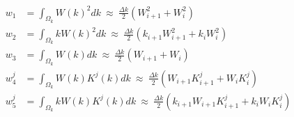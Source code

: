 \documentclass{article}
\def\ds{\displaystyle}
\begin{document}
\begin{align*}
w_1 & = \ds\int_{\Omega_k} W(k)^2 dk \: \approx \: \frac{\Delta k}{2}\left(W_{i+1}^2 + W_i^2 \right)  \\[5pt]
w_2 & = \ds\int_{\Omega_k} kW(k)^2 dk \: \approx \: \frac{\Delta k}{2}\left( k_{i+1}W_{i+1}^2+k_iW_i^2\right)   \\[5pt]
w_3 & = \ds\int_{\Omega_k} W(k)dk \: \approx \: \frac{\Delta k}{2} \left( W_{i+1} + W_i \right) \\[5pt]
w^j_4 & = \ds\int_{\Omega_k}W(k)K^j(k) dk \: \approx \: \frac{\Delta k}{2} \left(W_{i+1}K^j_{i+1} + W_iK^j_i \right) \\[5pt]
w^j_5 & = \ds\int_{\Omega_k}kW(k)K^j(k)dk \: \approx \: \frac{\Delta k}{2} \left(k_{i+1}W_{i+1}K^j_{i+1} + k_iW_iK^j_i \right) \\[5pt]
\end{align*}
\end{document}
